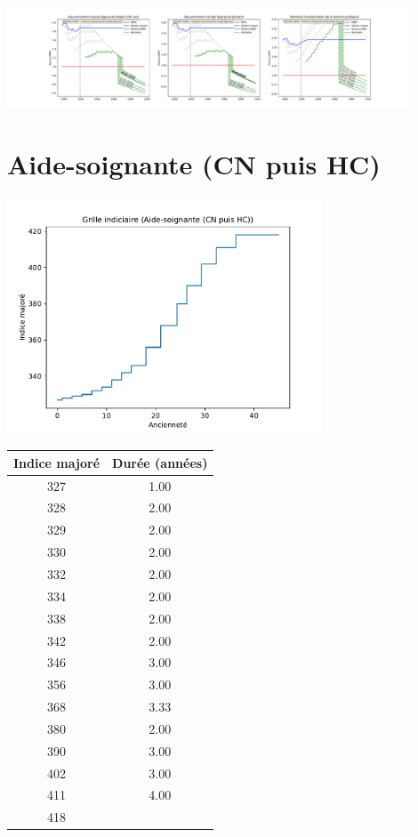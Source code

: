  \begin{center}\includegraphics[width=0.9\textwidth]{fig/Infirmier_2003_22_dest_retraite.pdf}\end{center} \label{fig/Infirmier_2003_22_dest_retraite.pdf} 

\newpage 
 
\chapter{Aide-soignante (CN puis HC)} 

\begin{minipage}{0.55\linewidth}\includegraphics[width=0.7\textwidth]{fig/grille_AideSoignant.pdf}\end{minipage} 
\begin{minipage}{0.3\linewidth} 
 \begin{center} 

\begin{tabular}[htb]{|c|c|} 
\hline 
 Indice majoré &  Durée (années) \\ 
\hline \hline 
 327 &  1.00 \\ 
\hline 
 328 &  2.00 \\ 
\hline 
 329 &  2.00 \\ 
\hline 
 330 &  2.00 \\ 
\hline 
 332 &  2.00 \\ 
\hline 
 334 &  2.00 \\ 
\hline 
 338 &  2.00 \\ 
\hline 
 342 &  2.00 \\ 
\hline 
 346 &  3.00 \\ 
\hline 
 356 &  3.00 \\ 
\hline 
 368 &  3.33 \\ 
\hline 
 380 &  2.00 \\ 
\hline 
 390 &  3.00 \\ 
\hline 
 402 &  3.00 \\ 
\hline 
 411 &  4.00 \\ 
\hline 
 418 &   \\ 
\hline 
\hline 
\end{tabular} 
\end{center} 
 \end{minipage} 



